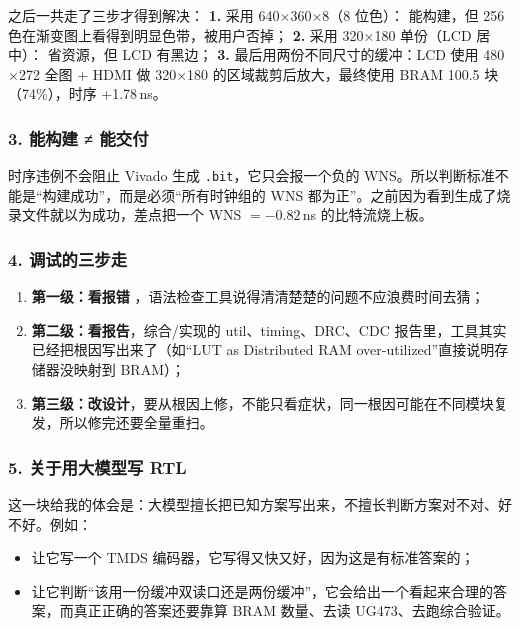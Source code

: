 \documentclass[withoutpreface,bwprint]{cumcmthesis}
\begin{document}
之后一共走了三步才得到解决：
\textbf{1.} 采用 640$\times$360$\times$8（8 位色）： 能构建，但 256 色在渐变图上看得到明显色带，被用户否掉；
\textbf{2.} 采用 320$\times$180 单份（LCD 居中）： 省资源，但 LCD 有黑边；
\textbf{3.} 最后用两份不同尺寸的缓冲：LCD 使用 480$\times$272 全图 + HDMI 做 320$\times$180 的区域裁剪后放大，最终使用 BRAM 100.5 块（74\%），时序 +1.78\,ns。


\subsubsection*{3. 能构建 ≠ 能交付}

时序违例不会阻止 Vivado 生成 \texttt{.bit}，它只会报一个负的 WNS。所以判断标准不能是“构建成功”，而是必须“所有时钟组的 WNS 都为正”。之前因为看到生成了烧录文件就以为成功，差点把一个 WNS $=-0.82$\,ns 的比特流烧上板。

\subsubsection*{4. 调试的三步走}

\begin{enumerate}
\item \textbf{第一级：看报错} ，语法检查工具说得清清楚楚的问题不应浪费时间去猜；
\item \textbf{第二级：看报告}，综合/实现的 util、timing、DRC、CDC 报告里，工具其实已经把根因写出来了（如“LUT as Distributed RAM over-utilized”直接说明存储器没映射到 BRAM）；
\item \textbf{第三级：改设计}，要从根因上修，不能只看症状，同一根因可能在不同模块复发，所以修完还要全量重扫。
\end{enumerate}

\subsubsection*{5. 关于用大模型写 RTL}

这一块给我的体会是：大模型擅长把已知方案写出来，不擅长判断方案对不对、好不好。例如：

\begin{itemize}
\item 让它写一个 TMDS 编码器，它写得又快又好，因为这是有标准答案的；
\item 让它判断“该用一份缓冲双读口还是两份缓冲”，它会给出一个看起来合理的答案，而真正正确的答案还要靠算 BRAM 数量、去读 UG473、去跑综合验证。
\end{itemize}
\end{document}
